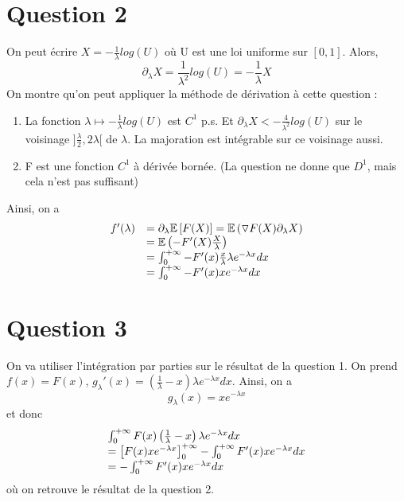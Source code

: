 \documentclass[12pt]{article}
\newcommand{\1}{\mathbb{I}} %
\begin{document}
\section*{Question 2}
On peut écrire $X = -\frac{1}{\lambda} log(U)$ où U est une loi uniforme sur $[0, 1]$. Alors, 
\[
    \partial_\lambda X = \frac{1}{\lambda^2}log(U) = -\frac{1}{\lambda}X
\]
On montre qu'on peut appliquer la méthode de dérivation à cette question :
\begin{enumerate}
    \item La fonction $\lambda \mapsto -\frac{1}{\lambda} log(U)$ est $C^1$ p.s. Et $\partial_\lambda X < -\frac{4}{\lambda^2} log(U)$ sur le voisinage $]\frac{\lambda}{2}, 2\lambda[$ de $\lambda$. La majoration est intégrable sur ce voisinage aussi.
    \item F est une fonction $C^{1}$ à dérivée bornée. (La question ne donne que $D^{1}$, mais cela n'est pas suffisant)
\end{enumerate}
Ainsi, on a
\begin{equation*}
    \begin{array}[h]{r l}
    f'(\lambda) & = \partial_\lambda \mathbb{E}\left[F(X)\right] = \mathbb{E}\left( \triangledown F(X)\partial_\lambda X \right)\\
    &   =\mathbb{E}\left( -F'(X)\frac{X}{\lambda} \right)\\
    &   = \int_0^{+\infty} -F'(x)\frac{x}{\lambda}\lambda e^{-\lambda x} dx\\
    &   = \int_0^{+\infty} -F'(x)xe^{-\lambda x} dx\\
    \end{array}
\end{equation*}

\section*{Question 3}
On va utiliser l'intégration par parties sur le résultat de la question 1. On prend $f(x) = F(x)$, $g_\lambda'(x) = \left( \frac{1}{\lambda} - x \right) \lambda e^{-\lambda x} dx$. Ainsi, on a 
\[
    g_\lambda (x) = xe^{-\lambda x}
\]
et donc
\begin{equation*}
    \begin{array}[h]{l}
    \int_0^{+\infty} F(x)\left( \frac{1}{\lambda} - x\right) \lambda e^{-\lambda x} dx\\
    = \left[ F(x)xe^{-\lambda x} \right]^{+\infty}_{0} - \int_0^{+\infty} F'(x) xe^{-\lambda x} dx\\
    = -\int_0^{+\infty} F'(x)xe^{-\lambda x} dx
        
    \end{array}
    \label{non}
\end{equation*}
où on retrouve le résultat de la question 2.
\end{document}
